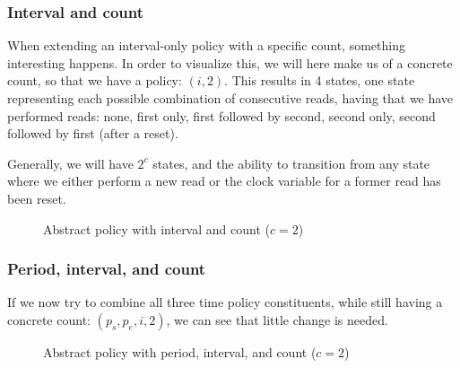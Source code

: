 \subsubsection{Interval and count}
When extending an interval-only policy with a specific count, something interesting happens.
In order to visualize this, we will here make us of a concrete count, so that we have a policy: $(i, 2)$.
This results in 4 states, one state representing each possible combination of consecutive reads, having that we have performed reads: none, first only, first followed by second, second only, second followed by first (after a reset).

Generally, we will have $2^c$ states, and the ability to transition from any state where we either perform a new read or the clock variable for a former read has been reset.

\begin{figure}[H]
  \centering
  
  \caption{Abstract policy with interval and count ($c = 2$)}
\end{figure}

\subsubsection{Period, interval, and count}
If we now try to combine all three time policy constituents, while still having a concrete count: $(p_s, p_e, i, 2)$, we can see that little change is needed.

\begin{figure}[H]
  \centering
  
  \caption{Abstract policy with period, interval, and count ($c = 2$)}
\end{figure}

